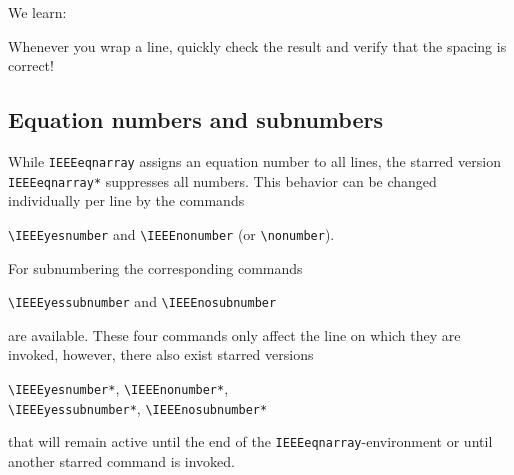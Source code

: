 \documentclass[a4paper,11pt]{article}
\begin{document}
We learn:
\begin{whitebox}
  \centering
  Whenever you wrap a line, quickly check the result and verify that
  the spacing is correct!
\end{whitebox}


\subsection{Equation numbers and subnumbers}
\label{sec:equation-numbering}

%
While \verb+IEEEeqnarray+ assigns an equation number to all lines, the
starred version \verb+IEEEeqnarray*+ suppresses all numbers. This
behavior can be changed individually per line by the commands
\begin{center}
  \verb+\IEEEyesnumber+ and \verb+\IEEEnonumber+ (or
  \verb+\nonumber+). 
\end{center}
For subnumbering the corresponding commands
\begin{center}
  \verb+\IEEEyessubnumber+ and \verb+\IEEEnosubnumber+   
\end{center}
are available. These four commands only affect the line on which they
are invoked, however, there also exist starred versions
\begin{center}
  \verb+\IEEEyesnumber*+, \verb+\IEEEnonumber*+, \\
  \verb+\IEEEyessubnumber*+, \verb+\IEEEnosubnumber*+ 
\end{center}
that will remain active until the end of the
\verb+IEEEeqnarray+-environment or until another starred command is
invoked.
\end{document}
